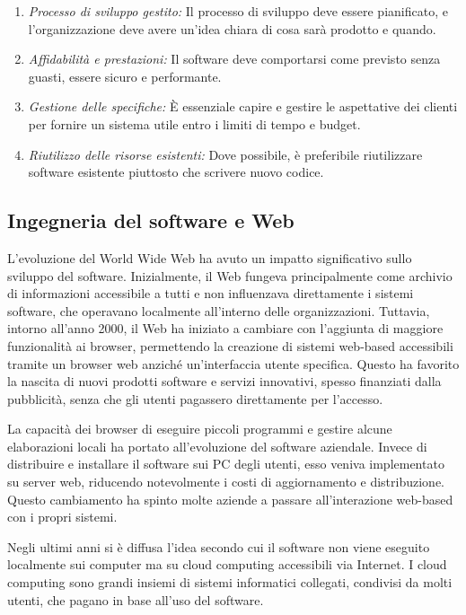 \begin{enumerate}
    \item \textit{Processo di sviluppo gestito:} Il processo di sviluppo deve essere pianificato, e l'organizzazione deve avere un'idea chiara di cosa sarà prodotto e quando.
    \item \textit{Affidabilità e prestazioni:} Il software deve comportarsi come previsto senza guasti, essere sicuro e performante.
    \item \textit{Gestione delle specifiche:} È essenziale capire e gestire le aspettative dei clienti per fornire un sistema utile entro i limiti di tempo e budget.
    \item \textit{Riutilizzo delle risorse esistenti:} Dove possibile, è preferibile riutilizzare software esistente piuttosto che scrivere nuovo codice.
\end{enumerate}

\subsection{Ingegneria del software e Web}
L'evoluzione del World Wide Web ha avuto un impatto significativo sullo sviluppo del software. Inizialmente, il Web fungeva principalmente come archivio di informazioni accessibile a tutti e non influenzava direttamente i sistemi software, che operavano localmente all'interno delle organizzazioni. Tuttavia, intorno all'anno 2000, il Web ha iniziato a cambiare con l'aggiunta di maggiore funzionalità ai browser, permettendo la creazione di sistemi web-based accessibili tramite un browser web anziché un'interfaccia utente specifica. Questo ha favorito la nascita di nuovi prodotti software e servizi innovativi, spesso finanziati dalla pubblicità, senza che gli utenti pagassero direttamente per l'accesso.

La capacità dei browser di eseguire piccoli programmi e gestire alcune elaborazioni locali ha portato all'evoluzione del software aziendale. Invece di distribuire e installare il software sui PC degli utenti, esso veniva implementato su server web, riducendo notevolmente i costi di aggiornamento e distribuzione. Questo cambiamento ha spinto molte aziende a passare all'interazione web-based con i propri sistemi.

Negli ultimi anni si è diffusa l'idea secondo cui il software non viene eseguito localmente sui computer ma su cloud computing accessibili via Internet. I cloud computing sono grandi insiemi di sistemi informatici collegati, condivisi da molti utenti, che pagano in base all'uso del software.

